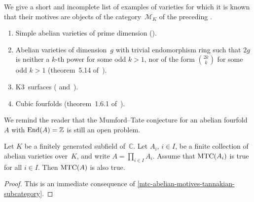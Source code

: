 \documentclass[10pt,twoside,leqno]{article}
\numberwithin{equation}{subsection}
\newcommand{\End}{\textnormal{End}}
\newcommand{\ZZ}{\mathbb{Z}}
\newcommand{\CC}{\mathbb{C}}
\newcommand{\MTC}{\textnormal{MTC}}
\begin{document}
\begin{remark} %
 We give a short and incomplete list of examples of varieties
 for which it is known that their motives
 are objects of the category~$\mathcal{M}_K$
 of the preceding .
 \begin{enumerate}
  \item Simple abelian varieties of prime dimension (). %
  \item Abelian varieties of dimension~$g$ with trivial endomorphism ring
   such that $2g$ is neither a $k$-th power for some odd $k > 1$,
   nor of the form $\binom{2k}{k}$ for some odd $k > 1$
   (theorem~5.14 of~\cite{Pi98}).
  \item K3~surfaces (\cite{MTCK3I} and~\cite{MTCK3II}).
  \item Cubic fourfolds (theorem~1.6.1 of~\cite{An96}).
 \end{enumerate}
 We remind the reader that the Mumford--Tate conjecture
 for an abelian fourfold~$A$ with $\End(A) = \ZZ$
 is still an open problem.
\end{remark}

\begin{theorem} %
 \label{mtcaxa}
 Let $K$ be a finitely generated subfield of~$\CC$.
 Let $A_i$, $i \in I$, be a finite collection of abelian varieties over~$K$,
	and write $A = \prod_{i \in I} A_i$.
 Assume that $\MTC(A_i)$ is true for all $i \in I$.
 Then $\MTC(A)$ is also true.
 \begin{proof}
  This is an immediate consequence of
  \cref{mtc-abelian-motives-tannakian-subcategory}.
 \end{proof}
\end{theorem}


\printbibliography
\end{document}
